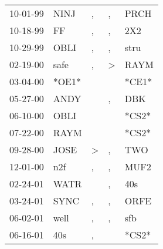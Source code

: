 \begin{supertabular}{p{0.07\textwidth}p{0.06\textwidth}p{0.02\textwidth}p{0.02\textwidth}p{0.06\textwidth}}
 10-01-99\textsuperscript{} &           NINJ\textsuperscript{} &                , &             , &           PRCH\textsuperscript{} \\
 10-18-99\textsuperscript{} &             FF\textsuperscript{} &                , &             , &            2X2\textsuperscript{} \\
 10-29-99\textsuperscript{} &           OBLI\textsuperscript{} &                , &             , &           stru\textsuperscript{} \\
 02-19-00\textsuperscript{} &           safe\textsuperscript{} &                , &  \textgreater &           RAYM\textsuperscript{} \\
 03-04-00\textsuperscript{} &                            *OE1* &                  &               &                            *CE1* \\
 05-27-00\textsuperscript{} &           ANDY\textsuperscript{} &                  &             , &            DBK\textsuperscript{} \\
 06-10-00\textsuperscript{} &           OBLI\textsuperscript{} &                  &               &                            *CS2* \\
 07-22-00\textsuperscript{} &           RAYM\textsuperscript{} &                  &               &                            *CS2* \\
 09-28-00\textsuperscript{} &           JOSE\textsuperscript{} &     \textgreater &             , &            TWO\textsuperscript{} \\
 12-01-00\textsuperscript{} &            n2f\textsuperscript{} &                , &             , &           MUF2\textsuperscript{} \\
 02-24-01\textsuperscript{} &           WATR\textsuperscript{} &                  &             , &            40s\textsuperscript{} \\
 03-24-01\textsuperscript{} &           SYNC\textsuperscript{} &                , &             , &           ORFE\textsuperscript{} \\
 06-02-01\textsuperscript{} &           well\textsuperscript{} &                , &             , &            sfb\textsuperscript{} \\
 06-16-01\textsuperscript{} &            40s\textsuperscript{} &                , &               &                            *CS2* \\

\end{supertabular}
